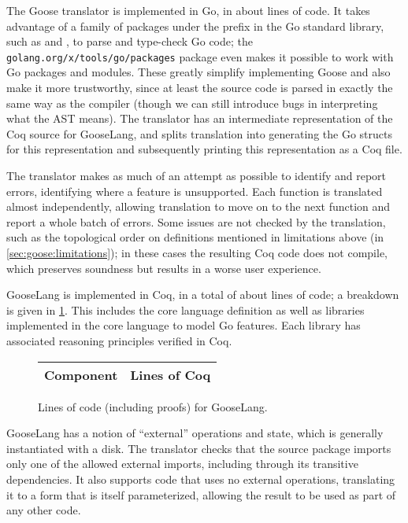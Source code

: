 
The Goose translator is implemented in Go, in about  lines of code.
It takes advantage of a family of packages under
the  prefix in the Go standard library, such as  and , to
parse and type-check Go code; the \texttt{golang.org/x/tools/go/packages} package
even makes it possible to work with Go packages and modules. These greatly
simplify implementing Goose and also make it more trustworthy, since at least
the source code is parsed in exactly the same way as the compiler (though we can
still introduce bugs in interpreting what the AST means).
The translator has an intermediate representation of the Coq source for
GooseLang, and splits translation into generating the Go structs for this
representation and subsequently printing this representation as a Coq file.

The translator makes as much of an attempt as possible to identify and report
errors, identifying where a feature is unsupported. Each function is translated
almost independently, allowing translation to move on to the next function and
report a whole batch of errors. Some issues are not checked by the translation,
such as the topological order on definitions mentioned in limitations above (in
\cref{sec:goose:limitations}); in these cases the resulting Coq code
does not compile, which preserves soundness but results in a worse user
experience.

GooseLang is implemented in Coq, in a total of about  lines of code;
a breakdown is given in \cref{fig:gooselang:lines}.
This includes the core language definition as well as libraries implemented in the
core language to model Go features. Each library has associated reasoning
principles verified in Coq.

\begin{figure}
\centering
\begin{tabular}{lr}
\toprule
\bf Component & \bf Lines of Coq \\
\midrule
  
\end{tabular}
\caption[Lines of code for GooseLang]%
{Lines of code (including proofs) for GooseLang.}
\label{fig:gooselang:lines}
\end{figure}


GooseLang has a notion of ``external'' operations and state, which is generally
instantiated with a disk. The translator checks that the source package imports
only one of the allowed external imports, including through its transitive
dependencies. It also supports code that uses no external operations,
translating it to a form that is itself parameterized, allowing the result to be
used as part of any other code.

